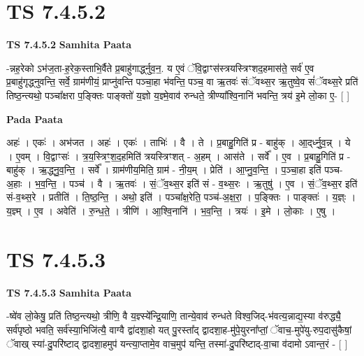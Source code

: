 \documentclass[17pt]{extarticle}
\begin{document}

\section{ TS 7.4.5.2 }

\textbf{TS 7.4.5.2 } \newline
\textbf{Samhita Paata} \newline

-न्नह॒रेको ऽभ॑ज॒ता-ह॒रेक॒स्ताभि॒र्वैते प्र॒बाहु॑गार्द्ध्नुव॒न॒. य ए॒वं ॅवि॒द्वाꣳस॑स्त्रयस्त्रिꣳशद॒हमास॑ते॒ सर्व॑ ए॒व प्र॒बाहु॑गृद्ध्नुवन्ति॒ सर्वे॒ ग्राम॑णीयं॒ प्राप्नु॑वन्ति पञ्चा॒हा भ॑वन्ति॒ पञ्च॒ वा ऋ॒तवः॑ संॅवथ्स॒र ऋ॒तुष्वे॒व सं॑ॅवथ्स॒रे प्रति॑ तिष्ठ॒न्त्यथो॒ पञ्चा᳚क्षरा प॒ङ्क्तिः पाङ्क्तो॑ य॒ज्ञो य॒ज्ञ्मे॒वाव॑ रुन्धते॒ त्रीण्या᳚श्वि॒नानि॑ भवन्ति॒ त्रय॑ इ॒मे लो॒का ए॒- [  ] \newline

\textbf{Pada Paata} \newline

अहः॑ । एकः॑ । अभ॑जत । अहः॑ । एकः॑ । ताभिः॑ । वै । ते । प्र॒बाहु॒गिति॑ प्र - बाहु॑क् । आ॒द्‌र्ध्नु॒व॒न्न् । ये । ए॒वम् । वि॒द्वाꣳसः॑ । त्र॒य॒स्त्रिꣳ॒॒श॒द॒हमिति॑ त्रयस्त्रिꣳशत् - अ॒हम् । आस॑ते । सर्वे᳚ । ए॒व । प्र॒बाहु॒गिति॑ प्र - बाहु॑क् । ऋ॒द्ध्नु॒व॒न्ति॒ । सर्वे᳚ । ग्राम॑णीय॒मिति॒ ग्राम॑ - नी॒य॒म् । प्रेति॑ । आ॒प्नु॒व॒न्ति॒ । प॒ञ्चा॒हा इति॑ पञ्च-अ॒हाः । भ॒व॒न्ति॒ । पञ्च॑ । वै । ऋ॒तवः॑ । सं॒ॅव॒थ्स॒र इति॑ सं - व॒थ्स॒रः । ऋ॒तुषु॑ । ए॒व । सं॒ॅव॒थ्स॒र इति॑ सं-व॒थ्स॒रे । प्रतीति॑ । ति॒ष्ठ॒न्ति॒ । अथो॒ इति॑ । पञ्चा᳚क्ष॒रेति॒ पञ्च॑-अ॒क्ष॒रा॒ । प॒ङ्क्तिः । पाङ्क्तः॑ । य॒ज्ञ्ः । य॒ज्ञ्म् । ए॒व । अवेति॑ । रु॒न्ध॒ते॒ । त्रीणि॑ । आ॒श्वि॒नानि॑ । भ॒व॒न्ति॒ । त्रयः॑ । इ॒मे । लो॒काः । ए॒षु ।  \newline





\section{ TS 7.4.5.3 }

\textbf{TS 7.4.5.3 } \newline
\textbf{Samhita Paata} \newline

-ष्वे॑व लो॒केषु॒ प्रति॑ तिष्ठ॒न्त्यथो॒ त्रीणि॒ वै य॒ज्ञ्स्ये᳚न्द्रि॒याणि॒ तान्ये॒वाव॑ रुन्धते विश्व॒जिद्-भ॑वत्य॒न्नाद्य॒स्या व॑रुद्ध्यै॒ सर्व॑पृष्ठो भवति॒ सर्व॑स्या॒भिजि॑त्यै॒ वाग्वै द्वा॑दशा॒हो यत् पु॒रस्ता᳚द् द्वादशा॒ह-मु॑पे॒युरना᳚प्तां॒ ॅवाच॒-मुपे॑यु-रुप॒दासु॑कैषां॒ ॅवाख् स्या॑-दु॒परि॑ष्टाद् द्वादशा॒हमुप॑ यन्त्या॒प्तामे॒व वाच॒मुप॑ यन्ति॒ तस्मा॑-दु॒परि॑ष्टाद्-वा॒चा व॑दामो ऽवान्त॒रं - [  ] \newline
\end{document}
